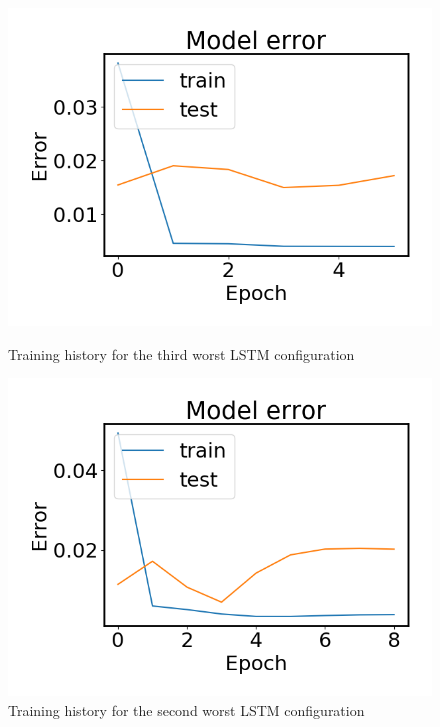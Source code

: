     \begin{figure}
        \begin{minipage}[b]{0.49\linewidth}
            \centering
            \includegraphics[width = \textwidth]{report/figures/analysis/lstm_gridsearch/worst_lstm_error_-3.png}
            \caption{Training history for the third worst LSTM configuration}
            \label{fig:lstm_grid_error_best_appendix}
        \end{minipage}
        \hfill\vline\hfill
        \begin{minipage}[b]{0.49\linewidth}
            \centering
            \includegraphics[width = \textwidth]{report/figures/analysis/lstm_gridsearch/worst_lstm_error_-2.png}
            \caption{Training history for the second worst LSTM configuration}
            \label{fig:lstm_grid_error_worst_appendix}
        \end{minipage}
    \end{figure}
    

